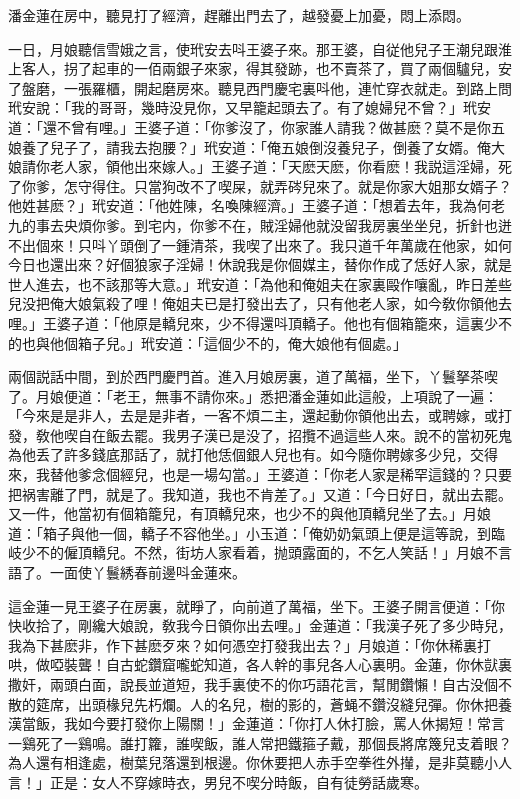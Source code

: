 潘金蓮在房中，聽見打了經濟，趕離出門去了，越發憂上加憂，悶上添悶。

一日，月娘聽信雪娥之言，使玳安去呌王婆子來。那王婆，自従他兒子王潮兒跟淮上客人，拐了起車的一佰兩銀子來家，得其發跡，也不賣茶了，買了兩個驢兒，安了盤磨，一張羅櫃，開起磨房來。聽見西門慶宅裏呌他，連忙穿衣就走。到路上問玳安說：「我的哥哥，幾時没見你，又早籠起頭去了。有了媳婦兒不曾？」玳安道：「還不曾有哩。」王婆子道：「你爹沒了，你家誰人請我？做甚麽？莫不是你五娘養了兒子了，請我去抱腰？」玳安道：「俺五娘倒沒養兒子，倒養了女婿。俺大娘請你老人家，領他出來嫁人。」王婆子道：「天麽天麽，你看麽！我説這淫婦，死了你爹，怎守得住。只當狗改不了喫屎，就弄硶兒來了。就是你家大姐那女婿子？他姓甚麽？」玳安道：「他姓陳，名喚陳經濟。」王婆子道：「想着去年，我為何老九的事去央煩你爹。到宅内，你爹不在，賊淫婦他就没留我房裏坐坐兒，折針也迸不出個來！只呌丫頭倒了一鍾清茶，我喫了出來了。我只道千年萬歲在他家，如何今日也還出來？好個狼家子淫婦！休說我是你個媒主，替你作成了恁好人家，就是世人進去，也不該那等大意。」玳安道：「為他和俺姐夫在家裏毆作嚷亂，昨日差些兒没把俺大娘氣殺了哩！俺姐夫已是打發出去了，只有他老人家，如今敎你領他去哩。」王婆子道：「他原是轎兒來，少不得還呌頂轎子。他也有個箱籠來，這裏少不的也與他個箱子兒。」玳安道：「這個少不的，俺大娘他有個處。」

兩個説話中間，到於西門慶門首。進入月娘房裏，道了萬福，坐下，丫鬟拏茶喫了。月娘便道：「老王，無事不請你來。」悉把潘金蓮如此這般，上項說了一遍：「今來是是非人，去是是非者，一客不煩二主，還起動你領他出去，或聘嫁，或打發，敎他喫自在飯去罷。我男子漢已是没了，招攬不過這些人來。說不的當初死鬼為他丢了許多錢底那話了，就打他恁個銀人兒也有。如今隨你聘嫁多少兒，交得來，我替他爹念個經兒，也是一場勾當。」王婆道：「你老人家是稀罕這錢的？只要把祸害離了門，就是了。我知道，我也不肯差了。」又道：「今日好日，就出去罷。又一件，他當初有個箱籠兒，有頂轎兒來，也少不的與他頂轎兒坐了去。」月娘道：「箱子與他一個，轎子不容他坐。」小玉道：「俺奶奶氣頭上便是這等說，到臨岐少不的僱頂轎兒。不然，街坊人家看着，抛頭露面的，不乞人笑話！」月娘不言語了。一面使丫鬟綉春前邊呌金蓮來。

這金蓮一見王婆子在房裏，就睜了，向前道了萬福，坐下。王婆子開言便道：「你快收拾了，剛纔大娘說，敎我今日領你出去哩。」金蓮道：「我漢子死了多少時兒，我為下甚麽非，作下甚麽歹來？如何憑空打發我出去？」月娘道：「你休稀裏打哄，做啞裝聾！自古蛇鑽窟嚨蛇知道，各人幹的事兒各人心裏明。金蓮，你休獃裏撒奸，兩頭白面，說長並道短，我手裏使不的你巧語花言，幫閒鑽懶！自古没個不散的筵席，出頭椽兒先朽爛。人的名兒，樹的影的，蒼蝇不鑽沒縫兒彈。你休把養漢當飯，我如今要打發你上陽關！」金蓮道：「你打人休打臉，罵人休揭短！常言一鷄死了一鷄鳴。誰打籮，誰喫飯，誰人常把鐵箍子戴，那個長將席篾兒支着眼？為人還有相逢處，樹葉兒落還到根邊。你休要把人赤手空拳徃外攆，是非莫聽小人言！」正是：女人不穿嫁時衣，男兒不喫分時飯，自有徒勞話歲寒。

